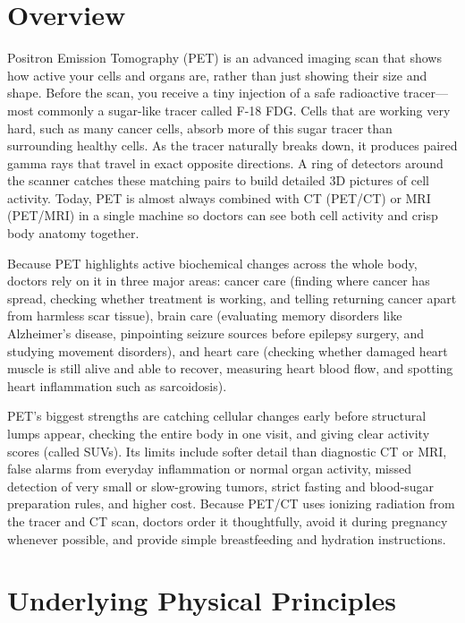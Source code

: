 \label{ch:infographic-petscan}

\section{Overview}

Positron Emission Tomography (PET) is an advanced imaging scan that shows how active your cells and organs are, rather than just showing their size and shape. Before the scan, you receive a tiny injection of a safe radioactive tracer---most commonly a sugar-like tracer called F-18 FDG. Cells that are working very hard, such as many cancer cells, absorb more of this sugar tracer than surrounding healthy cells. As the tracer naturally breaks down, it produces paired gamma rays that travel in exact opposite directions. A ring of detectors around the scanner catches these matching pairs to build detailed 3D pictures of cell activity. Today, PET is almost always combined with CT (PET/CT) or MRI (PET/MRI) in a single machine so doctors can see both cell activity and crisp body anatomy together.

Because PET highlights active biochemical changes across the whole body, doctors rely on it in three major areas: cancer care (finding where cancer has spread, checking whether treatment is working, and telling returning cancer apart from harmless scar tissue), brain care (evaluating memory disorders like Alzheimer's disease, pinpointing seizure sources before epilepsy surgery, and studying movement disorders), and heart care (checking whether damaged heart muscle is still alive and able to recover, measuring heart blood flow, and spotting heart inflammation such as sarcoidosis).

PET's biggest strengths are catching cellular changes early before structural lumps appear, checking the entire body in one visit, and giving clear activity scores (called SUVs). Its limits include softer detail than diagnostic CT or MRI, false alarms from everyday inflammation or normal organ activity, missed detection of very small or slow-growing tumors, strict fasting and blood-sugar preparation rules, and higher cost. Because PET/CT uses ionizing radiation from the tracer and CT scan, doctors order it thoughtfully, avoid it during pregnancy whenever possible, and provide simple breastfeeding and hydration instructions.

\section{Underlying Physical Principles}


